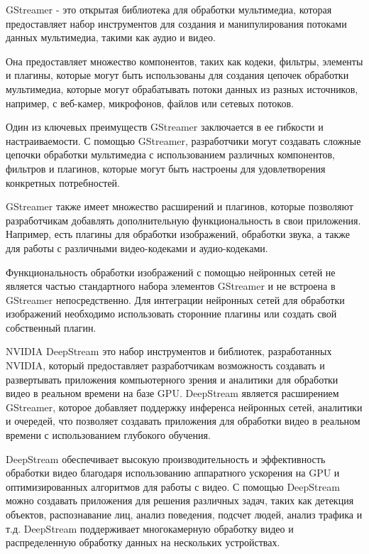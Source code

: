GStreamer - это открытая библиотека для обработки мультимедиа, которая предоставляет набор инструментов для создания и манипулирования потоками данных мультимедиа, такими как аудио и видео.

Она предоставляет множество компонентов, таких как кодеки, фильтры, элементы и плагины, которые могут быть использованы для создания цепочек обработки мультимедиа, которые могут обрабатывать потоки данных из разных источников, например, с веб-камер, микрофонов, файлов или сетевых потоков.

Один из ключевых преимуществ GStreamer заключается в ее гибкости и настраиваемости. С помощью GStreamer, разработчики могут создавать сложные цепочки обработки мультимедиа с использованием различных компонентов, фильтров и плагинов, которые могут быть настроены для удовлетворения конкретных потребностей.

GStreamer также имеет множество расширений и плагинов, которые позволяют разработчикам добавлять дополнительную функциональность в свои приложения. Например, есть плагины для обработки изображений, обработки звука, а также для работы с различными видео-кодеками и аудио-кодеками.

Функциональность обработки изображений с помощью нейронных сетей не является частью стандартного набора элементов GStreamer и не встроена в GStreamer непосредственно. Для интеграции нейронных сетей для обработки изображений необходимо использовать сторонние плагины или создать свой собственный плагин.


NVIDIA DeepStream это набор инструментов и библиотек, разработанных NVIDIA, который предоставляет разработчикам возможность создавать и развертывать приложения компьютерного зрения и аналитики для обработки видео в реальном времени на базе GPU. DeepStream является расширением GStreamer, которое добавляет поддержку инференса нейронных сетей, аналитики и очередей, что позволяет создавать приложения для обработки видео в реальном времени с использованием глубокого обучения. 

DeepStream обеспечивает высокую производительность и эффективность обработки видео благодаря использованию аппаратного ускорения на GPU и оптимизированных алгоритмов для работы с видео. С помощью DeepStream можно создавать приложения для решения различных задач, таких как детекция объектов, распознавание лиц, анализ поведения, подсчет людей, анализ трафика и т.д. DeepStream поддерживает многокамерную обработку видео и распределенную обработку данных на нескольких устройствах.

